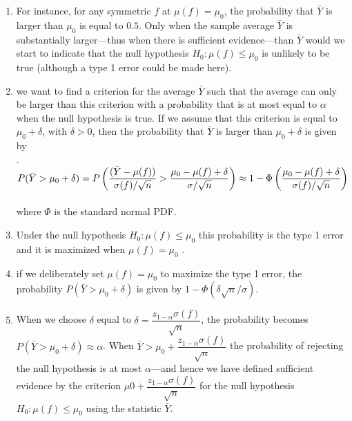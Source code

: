 \begin{enumerate}
    \item For instance, for any symmetric $f$ at $\mu( f ) = \mu_0 $, the probability that $\bar{Y}$ is larger than $\mu_0$ is equal to $0.5$.
    Only when the sample average $\bar{Y}$ is substantially larger—thus when there is sufficient evidence—than $\bar{Y}$ would we start to indicate that the null hypothesis $H_0 : \mu( f ) \leq \mu_0$ is unlikely to be true (although a type 1 error could be made here).
    \hfill \cite{statistics/book/Statistics-for-Data-Scientists/Maurits-Kaptein}

    \item we want to find a criterion for the average $\bar{Y}$ such that the average can only be larger than this criterion with a probability that is at most equal to $\alpha$ when the null hypothesis is true.
    If we assume that this criterion is equal to $\mu_0 + \delta$, with $\delta > 0$, then the probability that $\bar{Y}$ is larger than $\mu_0 + \delta$ is given by
    \hfill \cite{statistics/book/Statistics-for-Data-Scientists/Maurits-Kaptein}
    \\[0.3cm]
    .\hfill
    $
        P( \bar{Y} > \mu _0 + \delta)
        = P\left(\dfrac{ ( \bar{Y} - \mu ( f ))}{\sigma( f )/\sqrt{n}} > \dfrac{\mu _0 - \mu ( f ) + \delta}{\sigma/\sqrt{n}}\right)
        \approx 1 - \Phi\left(\dfrac{\mu _0 - \mu ( f ) + \delta}{\sigma( f )/\sqrt{n}}\right)
    $
    \hfill \cite{statistics/book/Statistics-for-Data-Scientists/Maurits-Kaptein}
    \\[0.3cm]
    where $\Phi$ is the standard normal PDF.
    \hfill \cite{statistics/book/Statistics-for-Data-Scientists/Maurits-Kaptein}

    \item Under the null hypothesis $H_0 : \mu( f ) \leq \mu_0$ this probability is the type 1 error and it is maximized when $\mu( f ) = \mu_0$ .
    \hfill \cite{statistics/book/Statistics-for-Data-Scientists/Maurits-Kaptein}

    \item if we deliberately set $\mu( f ) = \mu_0$ to maximize the type 1 error, the probability $P ( \bar{Y} > \mu_0 + \delta)$ is given by $1 - \Phi(\delta\sqrt{n}/\sigma)$.
    \hfill \cite{statistics/book/Statistics-for-Data-Scientists/Maurits-Kaptein}

    \item When we choose $\delta$ equal to $\delta = \dfrac{z_{1-\alpha} \sigma( f )}{\sqrt{n}}$, the probability becomes $P ( \bar{Y} > \mu_0 + \delta) \approx \alpha$.
    When $\bar{Y} > \mu_0 + \dfrac{z_{1 - \alpha} \sigma( f )}{\sqrt{n}}$ the probability of rejecting the null hypothesis is at most $\alpha$—and hence we have defined sufficient evidence by the criterion $\mu0 + \dfrac{z_{1 - \alpha} \sigma( f )}{\sqrt{n}}$ for the null hypothesis $H_0 : \mu( f ) \leq \mu_0$ using the statistic $\bar{Y} $.
    \hfill \cite{statistics/book/Statistics-for-Data-Scientists/Maurits-Kaptein}


\end{enumerate}
